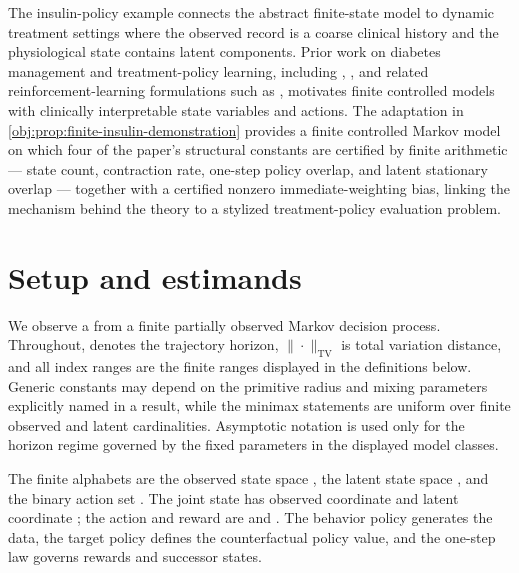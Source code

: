 \documentclass[11pt]{article}
\begin{document}
The insulin-policy example connects the abstract finite-state model to dynamic treatment settings where the observed record is a coarse clinical history and the physiological state contains latent components. Prior work on diabetes management and treatment-policy learning, including \citet{MaahsEtAl2012}, \citet{LuckettEtAl2020}, and related reinforcement-learning formulations such as \citet{NahumShani2018}, motivates finite controlled models with clinically interpretable state variables and actions. The adaptation in \cref{obj:prop:finite-insulin-demonstration} provides a finite controlled Markov model on which four of the paper's structural constants are certified by finite arithmetic --- state count, contraction rate, one-step policy overlap, and latent stationary overlap --- together with a certified nonzero immediate-weighting bias, linking the mechanism behind the theory to a stylized treatment-policy evaluation problem.


\section{Setup and estimands}

We observe a  from a finite partially observed Markov decision process. Throughout,  denotes the trajectory horizon, \(\|\cdot\|_{\mathrm{TV}}\) is total variation distance, and all index ranges are the finite ranges displayed in the definitions below. Generic constants may depend on the primitive radius and mixing parameters explicitly named in a result, while the minimax statements are uniform over finite observed and latent cardinalities. Asymptotic notation is used only for the horizon regime governed by the fixed parameters in the displayed model classes.

The finite alphabets are the observed state space , the latent state space , and the binary action set . The joint state  has observed coordinate  and latent coordinate ; the action and reward are  and . The behavior policy  generates the data, the target policy  defines the counterfactual policy value, and the one-step law  governs rewards and successor states.
\end{document}
